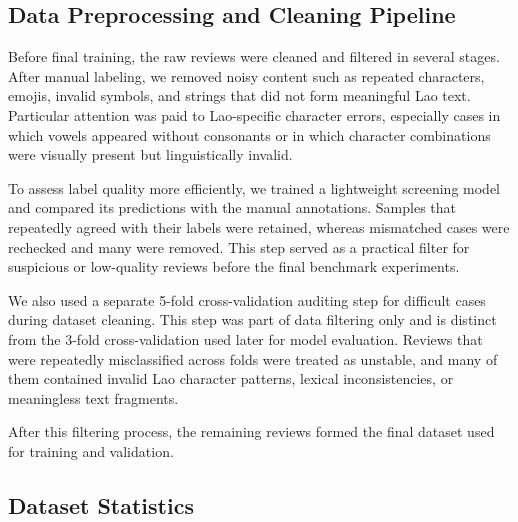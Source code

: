 \documentclass[conference, onecolumn]{IEEEtran}
\begin{document}
\subsection{Data Preprocessing and Cleaning Pipeline}
\label{subsec:data_preprocessing}

Before final training, the raw reviews were cleaned and filtered in several stages. After manual labeling, we removed noisy content such as repeated characters, emojis, invalid symbols, and strings that did not form meaningful Lao text. Particular attention was paid to Lao-specific character errors, especially cases in which vowels appeared without consonants or in which character combinations were visually present but linguistically invalid.

To assess label quality more efficiently, we trained a lightweight screening model and compared its predictions with the manual annotations. Samples that repeatedly agreed with their labels were retained, whereas mismatched cases were rechecked and many were removed. This step served as a practical filter for suspicious or low-quality reviews before the final benchmark experiments.

We also used a separate 5-fold cross-validation auditing step for difficult cases during dataset cleaning. This step was part of data filtering only and is distinct from the 3-fold cross-validation used later for model evaluation. Reviews that were repeatedly misclassified across folds were treated as unstable, and many of them contained invalid Lao character patterns, lexical inconsistencies, or meaningless text fragments.


After this filtering process, the remaining reviews formed the final dataset used for training and validation.





\subsection{Dataset Statistics}
\label{subsec:dataset_statistics}
\end{document}
